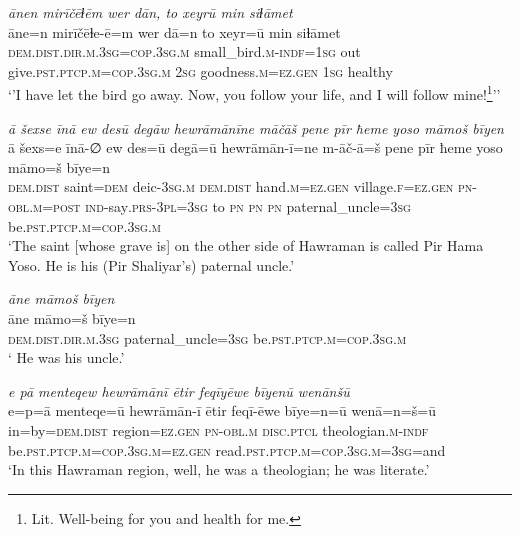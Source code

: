 \ea \label{DP.50}
\textit{ānen mirīčēɫēm wer dān, to xeyrū min siɫāmet} \\ 
\gll āne=n mirīčēɫe-ē=m wer dā=n to xeyr=ū min siɫāmet \\ 
 \textsc{dem.dist}\textsc{.dir}\textsc{.m}\textsc{.3sg}\textsc{=cop}\textsc{.3sg}\textsc{.m} small\_bird\textsc{.m}\textsc{-indf}\textsc{=1sg} out give\textsc{.pst}\textsc{.ptcp}\textsc{.m}\textsc{=cop}\textsc{.3sg}\textsc{.m} \textsc{2sg} goodness\textsc{.m}\textsc{=ez}\textsc{.gen} \textsc{1sg} healthy \\ 
\glt `’I have let the bird go away. Now, you follow your life, and I will follow mine!\footnote{Lit. Well-being for you and health for me.}’'
\z 
 
\ea \label{ZP.6}
\textit{ā šexse īnā ew desū degāw hewrāmānīne māčāš pene pīr ħeme yoso māmoš bīyen} \\ 
\gll ā šexs=e īnā-∅ ew des=ū degā=ū hewrāmān-ī=ne m-āč-ā=š pene pīr ħeme yoso māmo=š bīye=n \\ 
 \textsc{dem.dist} saint\textsc{=dem} deic\textsc{-3sg}\textsc{.m} \textsc{dem.dist} hand\textsc{.m}\textsc{\textsc{=ez.gen}} village\textsc{.f}\textsc{\textsc{=ez.gen}} \textsc{pn}\textsc{-obl}\textsc{.m}\textsc{=\textsc{post}} \textsc{ind-}say\textsc{.prs}\textsc{-3pl}\textsc{=3sg} to \textsc{pn} \textsc{pn} \textsc{pn} paternal\_uncle\textsc{=3sg} be\textsc{.pst}\textsc{.ptcp}\textsc{.m}\textsc{=cop}\textsc{.3sg}\textsc{.m} \\ 
\glt `The saint [whose grave is] on the other side of Hawraman is called Pir Hama Yoso. He is his (Pir Shaliyar’s) paternal uncle.'
\z 
 
\ea \label{ZP.7}
\textit{āne māmoš bīyen} \\ 
\gll āne māmo=š bīye=n \\ 
 \textsc{dem.dist}\textsc{.dir}\textsc{.m}\textsc{.3sg} paternal\_uncle\textsc{=3sg} be\textsc{.pst}\textsc{.ptcp}\textsc{.m}\textsc{=cop}\textsc{.3sg}\textsc{.m} \\ 
\glt ` He was his uncle.'
\z 
 
\ea \label{ZP.23}
\textit{e pā menteqew hewrāmānī ētir feqīyēwe bīyenū wenānšū} \\ 
\gll e=p=ā menteqe=ū hewrāmān-ī ētir feqī-ēwe bīye=n=ū wenā=n=š=ū \\ 
 in=by=\textsc{dem.dist} region\textsc{\textsc{=ez.gen}} \textsc{pn}\textsc{-obl}\textsc{.m} \textsc{disc.ptcl} theologian\textsc{.m}\textsc{-indf} be\textsc{.pst}\textsc{.ptcp}\textsc{.m}\textsc{=cop}\textsc{.3sg}\textsc{.m}\textsc{\textsc{=ez.gen}} read\textsc{.pst}\textsc{.ptcp}\textsc{.m}\textsc{=cop}\textsc{.3sg}\textsc{.m}\textsc{=3sg}=and \\ 
\glt `In this Hawraman region, well, he was a theologian; he was literate.'
\z 
 
